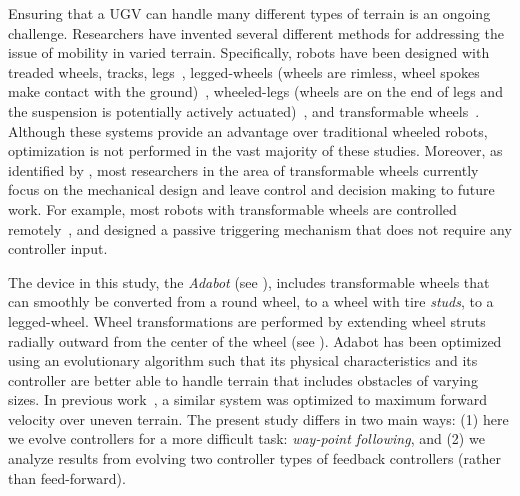 Ensuring that a UGV can handle many different types of terrain is an ongoing challenge.
%
Researchers have invented several different methods for addressing the issue of mobility in varied terrain.
%
Specifically, robots have been designed with
treaded wheels,
tracks,
legs~\citep{Haldane.ICRA.VelociRoACH.2013},
legged-wheels (wheels are rimless, wheel spokes make contact with the ground)~\citep{Saranli.IntJrnRoboRes.RHex.2001,Quinn.IROS.Whegs.2002,Eich.SSRR.Stair-climb-SAR.2008,Kenneally.IEEERobAutLetters.Legged-robots.2016},
wheeled-legs (wheels are on the end of legs and the suspension is potentially actively actuated)~\citep{Grand.2004.IJRR.StabilityTractionOptimization,Zheng.2015.AME.DesignAnalysisWheellegged,Smith.IROS.Tri-wheel.2015}, and
transformable wheels~\citep{Kim.2014.ITR.WheelTransformerWheelLeg,Chen.2014.ITM.QuattropedLegWheel,Chen.2017.ITR.TurboQuadNovelLeg,Wei.2017.JMR.DesignImplementationLeg}.
%
Although these systems provide an advantage over traditional wheeled robots, optimization is not performed in the vast majority of these studies.
%
Moreover, as identified by \citet{Mintchev.2016.IRAM.AdaptiveMorphologyDesign}, most researchers in the area of transformable wheels currently focus on the mechanical design and leave control and decision making to future work.
%
For example, most robots with transformable wheels are controlled remotely~\citep{She.IROS.Transformable-wheel.2015,Chen.2017.ITR.TurboQuadNovelLeg}, and \citet{Kim.2014.ITR.WheelTransformerWheelLeg} designed a passive triggering mechanism that does not require any controller input.


The device in this study, the \emph{Adabot} (see ), includes transformable wheels that can smoothly be converted from a round wheel, to a wheel with tire \emph{studs}, to a legged-wheel.
%
Wheel transformations are performed by extending wheel struts radially outward from the center of the wheel (see ).
%
Adabot has been optimized using an evolutionary algorithm such that its physical characteristics and its controller are better able to handle terrain that includes obstacles of varying sizes.
%
In previous work~\citep{Clark.2017.SSCI.Adabot}, a similar system was optimized to maximum forward velocity over uneven terrain.
%
The present study differs in two main ways: (1) here we evolve controllers for a more difficult task: \emph{way-point following}, and (2) we analyze results from evolving two controller types of feedback controllers (rather than feed-forward).



